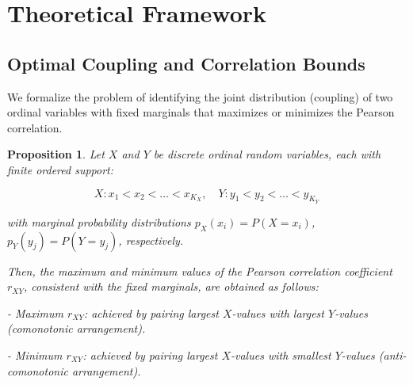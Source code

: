 \documentclass[
  12pt,
]{article}
\theoremstyle{plain}
\newtheorem{proposition}[theorem]{Proposition}
\theoremstyle{definition}
\theoremstyle{remark}
\begin{document}
\section{Theoretical Framework}\label{theoretical-framework}

\subsection{Optimal Coupling and Correlation
Bounds}\label{optimal-coupling-and-correlation-bounds}

We formalize the problem of identifying the joint distribution
(coupling) of two ordinal variables with fixed marginals that maximizes
or minimizes the Pearson correlation.

\label{prop-max-product}
\begin{proposition}

Let $X$ and $Y$ be discrete ordinal random variables, each with finite ordered support:

$$
X: x_1 < x_2 < \dots < x_{K_X},\quad Y: y_1 < y_2 < \dots < y_{K_Y}
$$

with marginal probability distributions $p_X(x_i) = P(X = x_i)$, $p_Y(y_j) = P(Y = y_j)$, respectively.

Then, the maximum and minimum values of the Pearson correlation coefficient $r_{XY}$, consistent with the fixed marginals, are obtained as follows:

- Maximum $r_{XY}$: achieved by pairing largest $X$-values with largest $Y$-values (comonotonic arrangement).
    
- Minimum $r_{XY}$: achieved by pairing largest $X$-values with smallest $Y$-values (anti-comonotonic arrangement).
\end{proposition}
\end{document}
